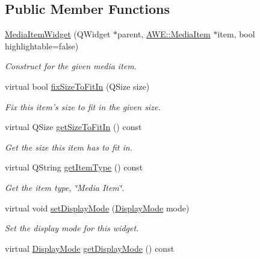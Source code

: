 \subsection*{Public Member Functions}
\begin{DoxyCompactItemize}
\item 
\hyperlink{class_u_i_1_1_media_item_widget_ad2071559c74b721a2a78bad60cfaa2c3}{Media\-Item\-Widget} (Q\-Widget $\ast$parent, \hyperlink{class_a_w_e_1_1_media_item}{A\-W\-E\-::\-Media\-Item} $\ast$item, bool highlightable=false)
\begin{DoxyCompactList}\small\item\em Construct for the given media item. \end{DoxyCompactList}\item 
virtual bool \hyperlink{class_u_i_1_1_media_item_widget_a36b5b52167a1b16fe50dc0a47966c574}{fix\-Size\-To\-Fit\-In} (Q\-Size size)
\begin{DoxyCompactList}\small\item\em Fix this item's size to fit in the given size. \end{DoxyCompactList}\item 
virtual Q\-Size \hyperlink{class_u_i_1_1_media_item_widget_a2f4856366fb1b837095d99c2b830326a}{get\-Size\-To\-Fit\-In} () const 
\begin{DoxyCompactList}\small\item\em Get the size this item has to fit in. \end{DoxyCompactList}\item 
virtual Q\-String \hyperlink{class_u_i_1_1_media_item_widget_a05d19d5507a00684f76578915b24f509}{get\-Item\-Type} () const 
\begin{DoxyCompactList}\small\item\em Get the item type, \char`\"{}\-Media Item\char`\"{}. \end{DoxyCompactList}\item 
virtual void \hyperlink{class_u_i_1_1_media_item_widget_a61b9c8ab9a86507ffaf2cca9284a8744}{set\-Display\-Mode} (\hyperlink{class_u_i_1_1_media_item_widget_aa1dc4a9a9dc77d8bd367fca6d8d6a35a}{Display\-Mode} mode)
\begin{DoxyCompactList}\small\item\em Set the display mode for this widget. \end{DoxyCompactList}\item 
virtual \hyperlink{class_u_i_1_1_media_item_widget_aa1dc4a9a9dc77d8bd367fca6d8d6a35a}{Display\-Mode} \hyperlink{class_u_i_1_1_media_item_widget_a132200400a3ff4e361e6634d9926bb10}{get\-Display\-Mode} () const 

\end{DoxyCompactItemize}
